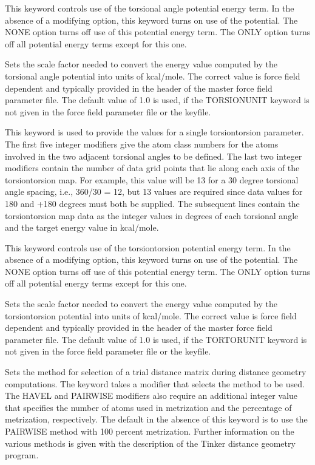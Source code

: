 \documentclass[letterpaper,11pt,english]{sphinxmanual}
\begin{document}
  This keyword controls use of the torsional angle potential energy term. In the absence of a modifying option, this keyword turns on use of the potential. The NONE option turns off use of this potential energy term. The ONLY option turns off all potential energy terms except for this one.

  Sets the scale factor needed to convert the energy value computed by the torsional angle potential into units of kcal/mole. The correct value is force field dependent and typically provided in the header of the master force field parameter file. The default value of 1.0 is used, if the TORSIONUNIT keyword is not given in the force field parameter file or the keyfile.

  This keyword is used to provide the values for a single torsion\sphinxhyphen{}torsion parameter. The first five integer modifiers give the atom class numbers for the atoms involved in the two adjacent torsional angles to be defined. The last two integer modifiers contain the number of data grid points that lie along each axis of the torsion\sphinxhyphen{}torsion map. For example, this value will be 13 for a 30 degree torsional angle spacing, i.e., 360/30 = 12, but 13 values are required since data values for \sphinxhyphen{}180 and +180 degrees must both be supplied. The subsequent lines contain the torsion\sphinxhyphen{}torsion map data as the integer values in degrees of each torsional angle and the target energy value in kcal/mole.

  This keyword controls use of the torsion\sphinxhyphen{}torsion potential energy term. In the absence of a modifying option, this keyword turns on use of the potential. The NONE option turns off use of this potential energy term. The ONLY option turns off all potential energy terms except for this one.

  Sets the scale factor needed to convert the energy value computed by the torsion\sphinxhyphen{}torsion potential into units of kcal/mole. The correct value is force field dependent and typically provided in the header of the master force field parameter file. The default value of 1.0 is used, if the TORTORUNIT keyword is not given in the force field parameter file or the keyfile.

  Sets the method for selection of a trial distance matrix during distance geometry computations. The keyword takes a modifier that selects the method to be used. The HAVEL and PAIRWISE modifiers also require an additional integer value that specifies the number of atoms used in metrization and the percentage of metrization, respectively. The default in the absence of this keyword is to use the PAIRWISE method with 100 percent metrization. Further information on the various methods is given with the description of the Tinker distance geometry program.
\end{document}
